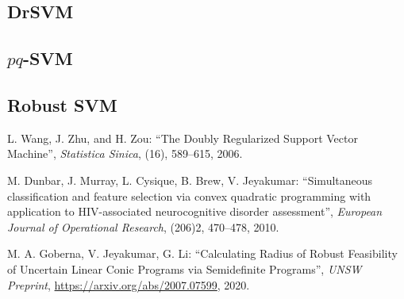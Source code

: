 \documentclass[11pt]{article}
\begin{document}
\subsection{DrSVM \cite{drsvm}}

\subsection{$pq$-SVM \cite{pqsvm}}

\subsection{Robust SVM \cite{rsvm}}

\begin{thebibliography}{99}

 L. Wang, J. Zhu, and H. Zou: ``The Doubly Regularized Support Vector Machine'', \emph{Statistica Sinica}, (16), 589–615, 2006.

 M. Dunbar, J. Murray, L. Cysique, B. Brew, V. Jeyakumar: ``Simultaneous classification and feature selection via convex quadratic programming with application to HIV-associated neurocognitive disorder assessment'', \emph{European Journal of Operational Research}, (206)2, 470–478, 2010.

 M. A. Goberna, V. Jeyakumar, G. Li: ``Calculating Radius of Robust Feasibility of Uncertain Linear Conic Programs via Semidefinite Programs'', \emph{UNSW Preprint}, \url{https://arxiv.org/abs/2007.07599}, 2020.


\end{thebibliography}
\end{document}
